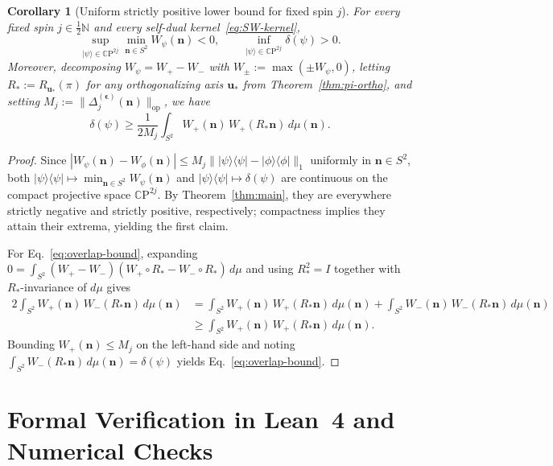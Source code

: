 \documentclass[11pt,a4paper]{article}
\newtheorem{corollary}[theorem]{Corollary}
\theoremstyle{remark}
\newcommand{\ket}[1]{\lvert #1 \rangle}
\newcommand{\bra}[1]{\langle #1 \rvert}
\newcommand{\bn}{\mathbf{n}}
\newcommand{\bu}{\mathbf{u}}
\begin{document}
\begin{corollary}[Uniform strictly positive lower bound for fixed spin $j$]\label{cor:uniform}
For every fixed spin $j \in \frac{1}{2}\mathbb{N}$ and every self-dual kernel~\eqref{eq:SW-kernel},
\[
\sup_{\ket{\psi} \in \mathbb{C}\mathrm{P}^{2j}} \min_{\bn \in S^2} W_\psi(\bn) < 0,
\qquad
\inf_{\ket{\psi} \in \mathbb{C}\mathrm{P}^{2j}} \delta(\psi) > 0.
\]
Moreover, decomposing $W_\psi = W_+ - W_-$ with $W_\pm := \max(\pm W_\psi, 0)$, letting $R_* := R_{\bu_*}(\pi)$ for any orthogonalizing axis $\bu_*$ from Theorem~\ref{thm:pi-ortho}, and setting $M_j := \|\Delta_j^{(\boldsymbol{\epsilon})}(\bn)\|_{\mathrm{op}}$, we have
\begin{equation}\label{eq:overlap-bound}
\delta(\psi) \ge \frac{1}{2M_j} \int_{S^2} W_+(\bn)\,W_+(R_*\bn)\,d\mu(\bn).
\end{equation}
\end{corollary}

\begin{proof}
Since $|W_\psi(\bn) - W_\phi(\bn)| \le M_j \|\ket{\psi}\bra{\psi} - \ket{\phi}\bra{\phi}\|_1$ uniformly in $\bn \in S^2$, both $\ket{\psi}\bra{\psi} \mapsto \min_{\bn \in S^2} W_\psi(\bn)$ and $\ket{\psi}\bra{\psi} \mapsto \delta(\psi)$ are continuous on the compact projective space $\mathbb{C}\mathrm{P}^{2j}$. By Theorem~\ref{thm:main}, they are everywhere strictly negative and strictly positive, respectively; compactness implies they attain their extrema, yielding the first claim.

For Eq.~\eqref{eq:overlap-bound}, expanding $0 = \int_{S^2}(W_+ - W_-)(W_+\circ R_* - W_-\circ R_*)\,d\mu$ and using $R_*^2 = I$ together with $R_*$-invariance of $d\mu$ gives
\begin{align*}
2\int_{S^2} W_+(\bn)\,W_-(R_*\bn)\,d\mu(\bn)
&= \int_{S^2} W_+(\bn)\,W_+(R_*\bn)\,d\mu(\bn) + \int_{S^2} W_-(\bn)\,W_-(R_*\bn)\,d\mu(\bn) \\
&\ge \int_{S^2} W_+(\bn)\,W_+(R_*\bn)\,d\mu(\bn).
\end{align*}
Bounding $W_+(\bn) \le M_j$ on the left-hand side and noting $\int_{S^2} W_-(R_*\bn)\,d\mu(\bn) = \delta(\psi)$ yields Eq.~\eqref{eq:overlap-bound}.
\end{proof}

\section{Formal Verification in Lean~4 and Numerical Checks}\label{sec:formal}
\end{document}
